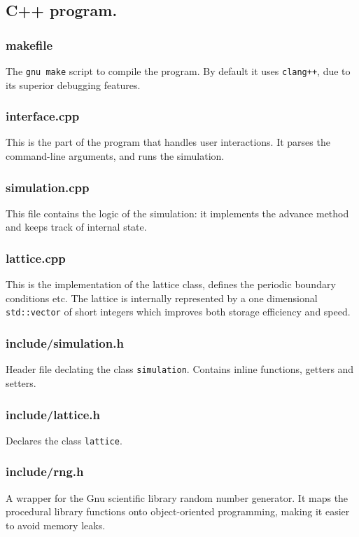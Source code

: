 \documentclass[12pt]{article}
\begin{document}
\subsection{C++ program.}
\subsubsection{makefile}\label{sec:makefile}
The \texttt{gnu make} script to compile the program. By default it uses \texttt{clang++}, due to its superior debugging features. 
\subsubsection{interface.cpp}\label{sec:interface}
This is the part of the program that handles user interactions. It parses the command-line arguments, and runs the simulation. 
\subsubsection{simulation.cpp}\label{sec:simulation}
This file contains the logic of the simulation: it implements the advance method and keeps track of internal state. 
\subsubsection{lattice.cpp}\label{sec:lattice}
This is the implementation of the lattice class, defines the periodic boundary conditions etc. The lattice is internally represented by a one dimensional \texttt{std::vector} of short integers which improves both storage efficiency and speed. 
\subsubsection{include/simulation.h}\label{sec:simulation.h}
Header file declating the class \texttt{simulation}. Contains inline functions, getters and setters.
\subsubsection{include/lattice.h}\label{sec:lattice.h}
Declares the class \texttt{lattice}.
\subsubsection{include/rng.h}\label{sec:rng.h}
A wrapper for the Gnu scientific library random number generator. It maps the procedural library functions onto object-oriented programming, making it easier to avoid memory leaks.





\end{document}
